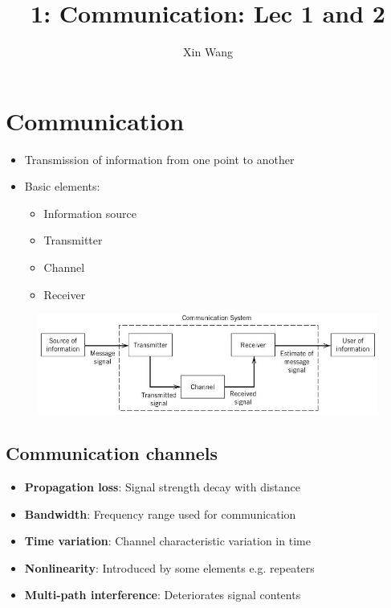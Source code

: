 \documentclass[conference]{IEEEtran}
\begin{document}
\title{1: Communication: Lec 1 and 2}
\author{Xin Wang}
\maketitle
\section{\textbf{Communication}}
\begin{itemize}
  \item Transmission of information from one point to another
  \item Basic elements:
  \begin{itemize}
      \item Information source
      \item Transmitter
      \item Channel
      \item Receiver
  \end{itemize}
\end{itemize}

\begin{figure} [h!]
    \centering
    \includegraphics[scale=0.5]{1.JPG}
\end{figure}

\subsection{Communication channels}

\begin{itemize}
    \item \textbf{Propagation loss}: Signal strength decay with distance
    \item \textbf{Bandwidth}: Frequency range used for communication 
    \item \textbf{Time variation}: Channel characteristic variation in time 
    \item \textbf{Nonlinearity}: Introduced by some elements e.g. repeaters 
    \item \textbf{Multi-path interference}: Deteriorates signal contents 
\end{itemize}
\end{document}
